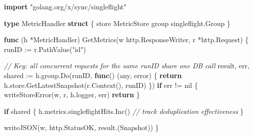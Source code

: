 \documentclass[
]{article}
\newenvironment{Shaded}{}{}
\newcommand{\CommentTok}[1]{\textcolor[rgb]{0.38,0.63,0.69}{\textit{#1}}}
\newcommand{\ControlFlowTok}[1]{\textcolor[rgb]{0.00,0.44,0.13}{\textbf{#1}}}
\newcommand{\DataTypeTok}[1]{\textcolor[rgb]{0.56,0.13,0.00}{#1}}
\newcommand{\KeywordTok}[1]{\textcolor[rgb]{0.00,0.44,0.13}{\textbf{#1}}}
\newcommand{\NormalTok}[1]{#1}
\newcommand{\OperatorTok}[1]{\textcolor[rgb]{0.40,0.40,0.40}{#1}}
\newcommand{\OtherTok}[1]{\textcolor[rgb]{0.00,0.44,0.13}{#1}}
\newcommand{\StringTok}[1]{\textcolor[rgb]{0.25,0.44,0.63}{#1}}
\begin{document}
\begin{Shaded}
\begin{Highlighting}[]
\KeywordTok{import} \StringTok{"golang.org/x/sync/singleflight"}

\KeywordTok{type}\NormalTok{ MetricHandler }\KeywordTok{struct} \OperatorTok{\{}
\NormalTok{    store  MetricStore}
\NormalTok{    group  singleflight}\OperatorTok{.}\NormalTok{Group}
\OperatorTok{\}}

\KeywordTok{func} \OperatorTok{(}\NormalTok{h }\OperatorTok{*}\NormalTok{MetricHandler}\OperatorTok{)}\NormalTok{ GetMetrics}\OperatorTok{(}\NormalTok{w http}\OperatorTok{.}\NormalTok{ResponseWriter}\OperatorTok{,}\NormalTok{ r }\OperatorTok{*}\NormalTok{http}\OperatorTok{.}\NormalTok{Request}\OperatorTok{)} \OperatorTok{\{}
\NormalTok{    runID }\OperatorTok{:=}\NormalTok{ r}\OperatorTok{.}\NormalTok{PathValue}\OperatorTok{(}\StringTok{"id"}\OperatorTok{)}

    \CommentTok{// Key: all concurrent requests for the same runID share one DB call}
\NormalTok{    result}\OperatorTok{,}\NormalTok{ err}\OperatorTok{,}\NormalTok{ shared }\OperatorTok{:=}\NormalTok{ h}\OperatorTok{.}\NormalTok{group}\OperatorTok{.}\NormalTok{Do}\OperatorTok{(}\NormalTok{runID}\OperatorTok{,} \KeywordTok{func}\OperatorTok{()} \OperatorTok{(}\NormalTok{any}\OperatorTok{,} \DataTypeTok{error}\OperatorTok{)} \OperatorTok{\{}
        \ControlFlowTok{return}\NormalTok{ h}\OperatorTok{.}\NormalTok{store}\OperatorTok{.}\NormalTok{GetLatestSnapshot}\OperatorTok{(}\NormalTok{r}\OperatorTok{.}\NormalTok{Context}\OperatorTok{(),}\NormalTok{ runID}\OperatorTok{)}
    \OperatorTok{\})}
    \ControlFlowTok{if}\NormalTok{ err }\OperatorTok{!=} \OtherTok{nil} \OperatorTok{\{}
\NormalTok{        writeStoreError}\OperatorTok{(}\NormalTok{w}\OperatorTok{,}\NormalTok{ r}\OperatorTok{,}\NormalTok{ h}\OperatorTok{.}\NormalTok{logger}\OperatorTok{,}\NormalTok{ err}\OperatorTok{)}
        \ControlFlowTok{return}
    \OperatorTok{\}}

    \ControlFlowTok{if}\NormalTok{ shared }\OperatorTok{\{}
\NormalTok{        h}\OperatorTok{.}\NormalTok{metrics}\OperatorTok{.}\NormalTok{singleflightHits}\OperatorTok{.}\NormalTok{Inc}\OperatorTok{()} \CommentTok{// track deduplication effectiveness}
    \OperatorTok{\}}

\NormalTok{    writeJSON}\OperatorTok{(}\NormalTok{w}\OperatorTok{,}\NormalTok{ http}\OperatorTok{.}\NormalTok{StatusOK}\OperatorTok{,}\NormalTok{ result}\OperatorTok{.(}\NormalTok{Snapshot}\OperatorTok{))}
\OperatorTok{\}}
\end{Highlighting}
\end{Shaded}
\end{document}
